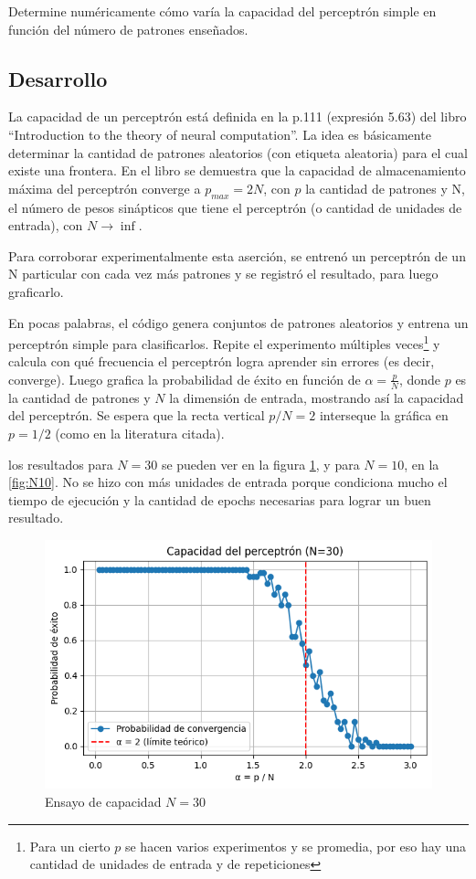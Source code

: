 \documentclass[11pt]{article} %
\begin{document}
Determine numéricamente cómo varía la capacidad del perceptrón simple en función del número de patrones enseñados.


\subsection{Desarrollo}

La capacidad de un perceptrón está definida en la p.111 (expresión 5.63) del libro ``Introduction to the theory of neural computation''. La idea es básicamente determinar la cantidad de patrones aleatorios (con etiqueta aleatoria) para el cual existe una frontera. En el libro se demuestra que la capacidad de almacenamiento máxima del perceptrón converge a $p_{max} = 2N$, con $p$ la cantidad de patrones y N, el número de pesos sinápticos que tiene el perceptrón (o cantidad de unidades de entrada), con $N \to \inf$.

Para corroborar experimentalmente esta aserción, se entrenó un perceptrón de un N particular con cada vez más patrones y se registró el resultado, para luego graficarlo.

En pocas palabras, el código genera conjuntos de patrones aleatorios y entrena un perceptrón simple para clasificarlos. Repite el experimento múltiples veces\footnote{Para un cierto $p$ se hacen varios experimentos y se promedia, por eso hay una cantidad de unidades de entrada y de repeticiones} y calcula con qué frecuencia el perceptrón logra aprender sin errores (es decir, converge). Luego grafica la probabilidad de éxito en función de $\alpha = \frac{p}{N}$, donde $p$ es la cantidad de patrones y $N$ la dimensión de entrada, mostrando así la capacidad del perceptrón. Se espera que la recta vertical $p/N = 2$ interseque la gráfica en $p=1/2$ (como en la literatura citada).


los resultados para $N=30$ se pueden ver en la figura \ref{fig:capacidad}, y para $N=10$, en la \ref{fig:N10}. No se hizo con más unidades de entrada porque condiciona mucho el tiempo de ejecución y la cantidad de epochs necesarias para lograr un buen resultado.

\begin{figure}[htbp!]
	\centering
	\includegraphics[width=0.7\linewidth]{../imgs/ej2/capacidad}
	\caption[]{Ensayo de capacidad $N=30$}
	\label{fig:capacidad}
\end{figure}
\end{document}
